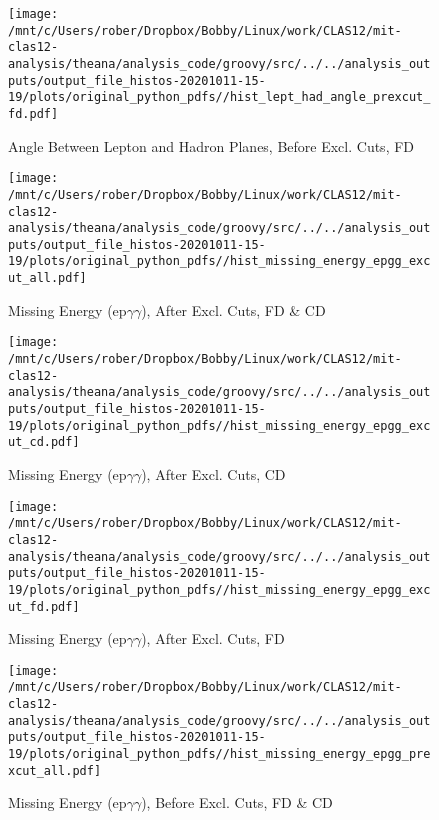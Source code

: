 \documentclass{article}
\begin{document}
\begin{landscape}
\begin{figure}[h]
        \texttt{[image: /mnt/c/Users/rober/Dropbox/Bobby/Linux/work/CLAS12/mit-clas12-analysis/theana/analysis\_code/groovy/src/../../analysis\_outputs/output\_file\_histos-20201011-15-19/plots/original\_python\_pdfs//hist\_lept\_had\_angle\_prexcut\_fd.pdf]}
        \captionsetup{textformat=empty,labelformat=blank}
        \caption{Angle Between Lepton and Hadron Planes, Before Excl. Cuts, FD}
    \end{figure}
    \clearpage
    
    \begin{figure}[h]
        \centering

        \texttt{[image: /mnt/c/Users/rober/Dropbox/Bobby/Linux/work/CLAS12/mit-clas12-analysis/theana/analysis\_code/groovy/src/../../analysis\_outputs/output\_file\_histos-20201011-15-19/plots/original\_python\_pdfs//hist\_missing\_energy\_epgg\_excut\_all.pdf]}
        \captionsetup{textformat=empty,labelformat=blank}
        \caption{Missing Energy (ep$\gamma$$\gamma$), After Excl. Cuts, FD \& CD}
    \end{figure}
    \clearpage
    
    \begin{figure}[h]
        \centering

        \texttt{[image: /mnt/c/Users/rober/Dropbox/Bobby/Linux/work/CLAS12/mit-clas12-analysis/theana/analysis\_code/groovy/src/../../analysis\_outputs/output\_file\_histos-20201011-15-19/plots/original\_python\_pdfs//hist\_missing\_energy\_epgg\_excut\_cd.pdf]}
        \captionsetup{textformat=empty,labelformat=blank}
        \caption{Missing Energy (ep$\gamma$$\gamma$), After Excl. Cuts, CD}
    \end{figure}
    \clearpage
    
    \begin{figure}[h]
        \centering

        \texttt{[image: /mnt/c/Users/rober/Dropbox/Bobby/Linux/work/CLAS12/mit-clas12-analysis/theana/analysis\_code/groovy/src/../../analysis\_outputs/output\_file\_histos-20201011-15-19/plots/original\_python\_pdfs//hist\_missing\_energy\_epgg\_excut\_fd.pdf]}
        \captionsetup{textformat=empty,labelformat=blank}
        \caption{Missing Energy (ep$\gamma$$\gamma$), After Excl. Cuts, FD}
    \end{figure}
    \clearpage
    
    \begin{figure}[h]
        \centering

        \texttt{[image: /mnt/c/Users/rober/Dropbox/Bobby/Linux/work/CLAS12/mit-clas12-analysis/theana/analysis\_code/groovy/src/../../analysis\_outputs/output\_file\_histos-20201011-15-19/plots/original\_python\_pdfs//hist\_missing\_energy\_epgg\_prexcut\_all.pdf]}
        \captionsetup{textformat=empty,labelformat=blank}
        \caption{Missing Energy (ep$\gamma$$\gamma$), Before Excl. Cuts, FD \& CD}
    \end{figure}
    \clearpage
    

\end{landscape}
\end{document}
